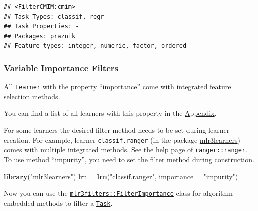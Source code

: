\documentclass[]{article}
\newenvironment{Shaded}{\begin{snugshade}}{\end{snugshade}}
\newcommand{\DataTypeTok}[1]{\textcolor[rgb]{0.13,0.29,0.53}{#1}}
\newcommand{\DecValTok}[1]{\textcolor[rgb]{0.00,0.00,0.81}{#1}}
\newcommand{\KeywordTok}[1]{\textcolor[rgb]{0.13,0.29,0.53}{\textbf{#1}}}
\newcommand{\NormalTok}[1]{#1}
\newcommand{\OperatorTok}[1]{\textcolor[rgb]{0.81,0.36,0.00}{\textbf{#1}}}
\newcommand{\StringTok}[1]{\textcolor[rgb]{0.31,0.60,0.02}{#1}}
\renewenvironment{Shaded} {\begin{snugshade}\small} {\end{snugshade}}
\begin{document}
\begin{verbatim}
## <FilterCMIM:cmim>
## Task Types: classif, regr
## Task Properties: -
## Packages: praznik
## Feature types: integer, numeric, factor, ordered
\end{verbatim}

\hypertarget{fs-var-imp-filters}{%
\subsubsection{Variable Importance Filters}\label{fs-var-imp-filters}}

All \href{https://mlr3.mlr-org.com/reference/Learner.html}{\texttt{Learner}} with the property ``importance'' come with integrated feature selection methods.

You can find a list of all learners with this property in the \protect\hyperlink{fs-filter-embedded-list}{Appendix}.

For some learners the desired filter method needs to be set during learner creation.
For example, learner \texttt{classif.ranger} (in the package \href{https://mlr3learners.mlr-org.com}{mlr3learners}) comes with multiple integrated methods.
See the help page of \href{https://www.rdocumentation.org/packages/ranger/topics/ranger}{\texttt{ranger::ranger}}.
To use method ``impurity'', you need to set the filter method during construction.

\begin{Shaded}
\begin{Highlighting}[]
\KeywordTok{library}\NormalTok{(}\StringTok{"mlr3learners"}\NormalTok{)}
\NormalTok{lrn =}\StringTok{ }\KeywordTok{lrn}\NormalTok{(}\StringTok{"classif.ranger"}\NormalTok{, }\DataTypeTok{importance =} \StringTok{"impurity"}\NormalTok{)}
\end{Highlighting}
\end{Shaded}

Now you can use the \href{https://mlr3filters.mlr-org.com/reference/FilterImportance.html}{\texttt{mlr3filters::FilterImportance}} class for algorithm-embedded methods to filter a \href{https://mlr3.mlr-org.com/reference/Task.html}{\texttt{Task}}.

\begin{Shaded}
\end{Shaded}
\end{document}
